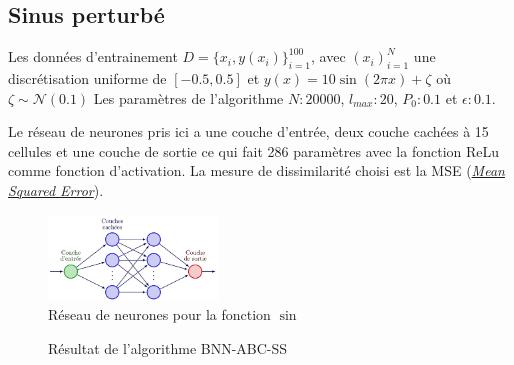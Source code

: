 \documentclass[french,12pt]{article}
\begin{document}
\subsection{Sinus perturbé}


Les données d'entrainement $D = \{x_i , y(x_i)\}_{i = 1}^{100}$, avec $(x_i)_{i = 1}^N$
une discrétisation uniforme de $[-0.5, 0.5]$ et $y(x) = 10 \sin(2 \pi x) + \zeta$ où $\zeta \sim \mathcal{N}(0.1)$
Les paramètres de l'algorithme $N : 20000$, $l_{max} : 20$, $P_0 : 0.1$ et $\epsilon : 0.1$.

Le réseau de neurones pris ici a une couche d'entrée, deux couche cachées à 15 cellules et une couche de sortie ce qui
fait 286 paramètres avec la fonction ReLu comme fonction d'activation. La mesure de dissimilarité
choisi est la MSE (\href{https://en.wikipedia.org/wiki/Mean_squared_error}{\textit{Mean Squared Error}}).


\begin{figure}[H]
    \centering
    \includegraphics[width = 0.4\textwidth]{FNN/Images/fnnSin/fnnSin_page-0001.jpg}
    \caption[short]{Réseau de neurones pour la fonction $\sin$}
\end{figure}

\begin{figure}[H]
    \centering
    \caption[short]{Résultat de l'algorithme BNN-ABC-SS}
\end{figure}
\end{document}
